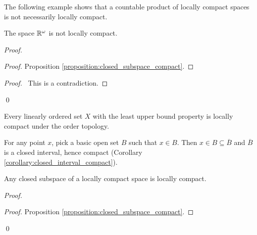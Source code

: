 The following example shows that a countable product of locally compact spaces
is not necessarily locally compact.

\begin{example}
    The space $\mathbb{R}^\omega$ is not locally compact.

    \begin{proof}
        \pf
        \begin{proof}
            \pf Proposition \ref{proposition:closed_subspace_compact}.
        \end{proof}
        \qedstep
        \begin{proof}
            \pf\ This is a contradiction.
        \end{proof}
        \qed
    \end{proof}
\end{example}

\begin{example}
    Every linearly ordered set $X$ with the least upper bound property is locally
    compact under the order topology.

    For any point $x$, pick a basic open set $B$ such that $x \in B$. Then
    $x \in B \subseteq \overline{B}$ and $\overline{B}$ is a closed interval,
    hence compact (Corollary \ref{corollary:closed_interval_compact}).
\end{example}

\begin{proposition}
    \label{proposition:closed_subspace_locally_compact}
    Any closed subspace of a locally compact space is locally compact.
\end{proposition}

\begin{proof}
    \pf
    \begin{proof}
        \pf Proposition \ref{proposition:closed_subspace_compact}.
    \end{proof}
    \qed
\end{proof}


